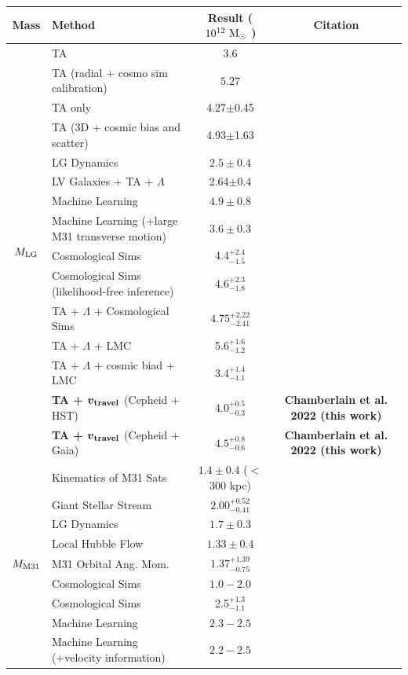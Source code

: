 \documentclass[twocolumn]{aastex631}
\newcommand{\mlg}{\ensuremath{M_{\rm LG}}}
\newcommand{\mmto}{\ensuremath{M_{\rm M31}}}
\newcommand{\bov}{\ensuremath{\boldsymbol{v}}}
\newcommand{\vtrav}{\ensuremath{\bov_{\rm travel}}}
\begin{document}
\begin{table}
  \centering
  \begin{tabular}{clc|c}
    \hline\hline
    Mass & Method & Result ($ 10^{12}~\mathrm{M}_\odot$ ) & Citation \\\hline
    \multirow{15}{*}{\mlg}  & TA & $3.6$ & \citealt{Lynden-Bell:1981} \\
    &TA (radial + cosmo sim calibration)  & $5.27$& \citealt{LiWhite2008} \\
    &{TA only} & {4.27$\pm$0.45} & \citealt{vdm2012} \\
    &{TA (3D + cosmic bias and scatter)} & {4.93$\pm$1.63} &\citealt{vdm2012}\\
    & LG Dynamics &$2.5\pm0.4$ & \citealt{Diaz2014}\\
    &{LV Galaxies + TA + $\Lambda$} & {2.64$\pm0.4$} & \citealt{Penarrubia2016} \\
    & Machine Learning & $4.9 \pm 0.8$ & \citealt{McLeod2017}\\
    & Machine Learning (+large M31 transverse motion) & $3.6\pm0.3$ &
    \citealt{McLeod2017}\\
    & Cosmological Sims & 4.4$^{+2.4}_{-1.5}$ & \citealt{Zhai2020}\\
    & Cosmological Sims (likelihood-free inference) & $4.6^{+2.3}_{-1.8}$ &
    \citealt{Lemos2021}\\
    & TA + $\Lambda$ + Cosmological Sims & $4.75^{+2.22}_{-2.41}$ & \citealt{Hartl2021}\\
    & TA + $\Lambda$ + LMC & 5.6$^{+1.6}_{-1.2}$ & \citealt{Benisty2022}\\
    & TA + $\Lambda$ + cosmic biad + LMC & 3.4$^{+1.4}_{-1.1}$ & \citealt{Benisty2022}\\
    & \textbf{TA + $\boldsymbol{\vtrav}$} (Cepheid + HST) & {$\boldsymbol{4.0^{+0.5}_{-0.3}}$}&
    \textbf{Chamberlain et al. 2022 (this work)}\\
    & \textbf{TA + $\boldsymbol{\vtrav}$} (Cepheid + Gaia) & {$\boldsymbol{4.5^{+0.8}_{-0.6}}$}&
    \textbf{Chamberlain et al. 2022 (this work)}\\
    \hline
    \multirow{9}{*}{\mmto}& Kinematics of M31 Sats & $1.4 \pm 0.4$ ($<$300 kpc)
    & \citealt{Watkins2010}\\
    & Giant Stellar Stream & $2.00^{+0.52}_{-0.41}$ & \citealt{Fardal2013}\\
    & LG Dynamics &$1.7\pm0.3$ & \citealt{Diaz2014}\\
    & Local Hubble Flow &  $1.33\pm0.4$ & \citealt{Penarrubia2016}\\
    & M31 Orbital Ang. Mom. & $1.37^{+1.39}_{-0.75}$ & \citealt{Patel2017b}\\
    & Cosmological Sims & $1.0-2.0$ & \citealt{Carlesi2017} \\
    & Cosmological Sims & 2.5$^{+1.3}_{-1.1}$ & \citealt{Zhai2020}\\
    & Machine Learning & $2.3-2.5$& \citealt{Villanueva-Domingo2021}\\
    & Machine Learning (+velocity information) & $2.2-2.5$ &
    \citealt{Villanueva-Domingo2021}\\


\end{tabular}
\end{table}
\end{document}
